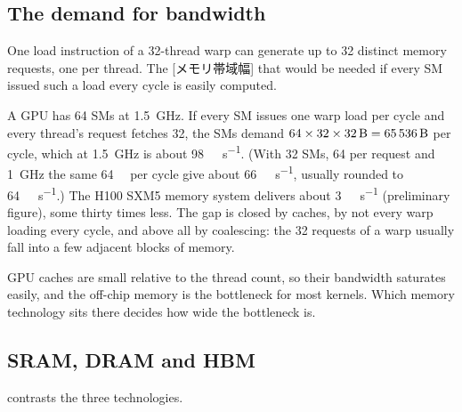 \documentclass[../main.tex]{subfiles}
\begin{document}
\subsection{The demand for bandwidth}

One load instruction of a 32-thread warp can generate up to 32 distinct
memory requests, one per thread.  The [メモリ帯域幅]
that would be needed if every SM issued such a load every cycle is
easily computed.

\begin{example}
  \label{ex:l04-bandwidth-demand}
  A GPU has 64 SMs at \SI{1.5}{\giga\hertz}.  If every SM issues one
  warp load per cycle and every thread's request fetches
  \SI{32}{\byte}, the SMs demand
  $64 \times 32 \times \SI{32}{\byte} = \SI{65536}{\byte}$ per cycle,
  which at \SI{1.5}{\giga\hertz} is about
  \SI{98}{\tera\byte\per\second}.  (With 32 SMs, \SI{64}{\byte} per
  request and \SI{1}{\giga\hertz} the same \SI{64}{\kibi\byte} per cycle
  give about \SI{66}{\tera\byte\per\second}, usually rounded to
  \SI{64}{\tera\byte\per\second}.)  The H100 SXM5 memory system delivers
  about \SI{3}{\tera\byte\per\second} (preliminary figure), some thirty
  times less.  The gap is closed
  by caches, by not every warp loading every cycle, and above all by
  coalescing: the 32 requests of a warp usually fall into a few
  adjacent blocks of memory.
\end{example}

GPU caches are small relative to the thread count, so their bandwidth
saturates easily, and the off-chip memory is the bottleneck for most
kernels.  Which memory technology sits there decides how wide the
bottleneck is.

\subsection{SRAM, DRAM and HBM}

 contrasts the three technologies.
\end{document}

